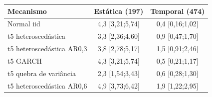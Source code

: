 \begin{tabular}{lcc}
\toprule
Mecanismo & Estática (197) & Temporal (474) \\
\midrule
Normal iid & 4,3 [3,21;5,74] & 0,4 [0,16;1,02] \\
t5 heteroscedástica & 3,3 [2,36;4,60] & 0,9 [0,47;1,70] \\
t5 heteroscedástica AR0,3 & 3,8 [2,78;5,17] & 1,5 [0,91;2,46] \\
t5 GARCH & 4,3 [3,21;5,74] & 0,5 [0,21;1,17] \\
t5 quebra de variância & 2,3 [1,54;3,43] & 0,6 [0,28;1,30] \\
t5 heteroscedástica AR0,6 & 4,9 [3,73;6,42] & 1,9 [1,22;2,95] \\
\bottomrule
\end{tabular}
